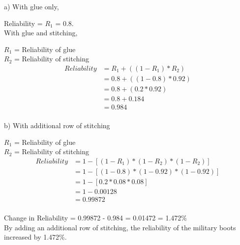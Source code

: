 \documentclass[12pt]{article}
\begin{document}
	a) With glue only,\\
	\begin{center}
	\end{center}
	
	Reliability = $R_{1}$ =  0.8.\\
	
	With glue and stitching,
	\begin{center}
	\end{center}
	
	$R_{1}$ = Reliability of glue\\
	$R_{2}$ = Reliability of stitching\\
	\begin{align*}
	Reliability &= R_{1}  + ((1 - R_{1}) * R_{2})\\
	&= 0.8  + ((1-0.8) * 0.92)\\
	&= 0.8 + (0.2 * 0.92)\\
	&= 0.8 + 0.184\\
	&= 0.984\\
	\end{align*}
	
	b) With additional row of stitching
	
	\begin{center}
	\end{center}
	
	$R_{1}$ = Reliability of glue\\
	$R_{2}$ = Reliability of stitching\\
	
	\begin{align*}
	Reliability &= 1 - [(1 - R_{1}) * (1 - R_{2}) * (1 - R_{2})]\\
	&= 1 - [(1- 0.8) * (1- 0.92) * (1 - 0.92)]\\
	&= 1 - [0.2 * 0.08 * 0.08]\\
	&= 1 - 0.00128\\
	&= 0.99872\\
	\end{align*}
	
	Change in Reliability = 0.99872 - 0.984 = 0.01472 = 1.472\%\\
	
	By adding an additional row of stitching, the reliability of the military boots increased by 1.472\%.
\end{document}
